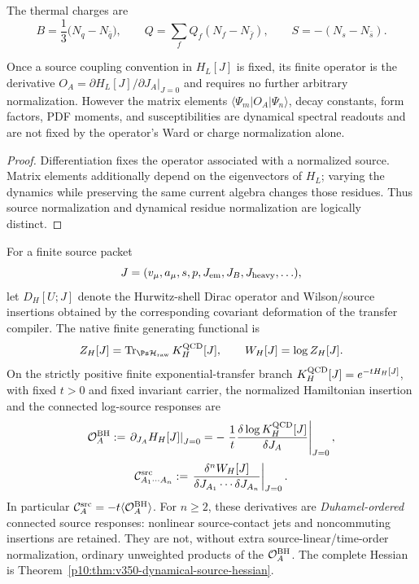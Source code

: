 \documentclass[12pt,a4paper]{article}
\begin{document}
The thermal charges are
\[
B=\frac{1}{3}\bigl(N_q-N_{\bar q}\bigr),
\qquad
Q=\sum_f Q_f(N_f-N_{\bar f}),
\qquad
S=-(N_s-N_{\bar s}).
\]

\begin{theorem}
\label{p10:thm:no-independent-source-normalization}
Once a source coupling convention in \(H_L[J]\) is fixed, its finite operator is the derivative \(O_A=\partial H_L[J]/\partial J_A|_{J=0}\) and requires no further arbitrary normalization.  However the matrix elements
\(\langle\Psi_m|O_A|\Psi_n\rangle\), decay constants, form factors, PDF moments, and susceptibilities are dynamical spectral readouts and are not fixed by the operator's Ward or charge normalization alone.
\end{theorem}
\begin{proof}
Differentiation fixes the operator associated with a normalized source.  Matrix elements additionally depend on the eigenvectors of \(H_L\); varying the dynamics while preserving the same current algebra changes those residues.  Thus source normalization and dynamical residue normalization are logically distinct.
\end{proof}


\begin{definition}
\label{p10:def:native-qcd-generating-functional}
For a finite source packet
\[
J=(v_\mu,a_\mu,s,p,J_{\rm em},J_B,J_{\rm heavy},\ldots),
\]
let \(D_H[U;J]\) denote the Hurwitz-shell Dirac operator and Wilson/source insertions
obtained by the corresponding covariant deformation of the transfer compiler.  The
native finite generating functional is
\begin{equation}
\label{p10:eq:native-qcd-generating-functional}
Z_H[J]
=
\operatorname{Tr}_{\Ps\mathcal H_{\rm raw}}
K_H^{\rm QCD}[J],
\qquad
W_H[J]=\log Z_H[J].
\end{equation}
On the strictly positive finite exponential-transfer branch
\(K_H^{\rm QCD}[J]=e^{-tH_H[J]}\), with fixed \(t>0\) and fixed invariant carrier, the normalized Hamiltonian insertion and the connected log-source responses are
\begin{equation}
\label{p10:eq:native-source-operator-derivative}
\mathcal O_A^{\rm BH}:=\left.\partial_{J_A}H_H[J]\right|_{J=0}
=-\left.\frac1t\frac{\delta\log K_H^{\rm QCD}[J]}{\delta J_A}\right|_{J=0},
\end{equation}
\begin{equation}
\label{p10:eq:native-connected-source-derivatives}
\mathcal C_{A_1\cdots A_n}^{\rm src}
:=\left.\frac{\delta^n W_H[J]}
{\delta J_{A_1}\cdots\delta J_{A_n}}\right|_{J=0}.
\end{equation}
In particular \(\mathcal C_A^{\rm src}=-t\langle\mathcal O_A^{\rm BH}\rangle\). For \(n\ge2\), these derivatives are \emph{Duhamel-ordered} connected source responses: nonlinear source-contact jets and noncommuting insertions are retained. They are not, without extra source-linear/time-order normalization, ordinary unweighted products of the \(\mathcal O_A^{\rm BH}\). The complete Hessian is Theorem~\ref{p10:thm:v350-dynamical-source-hessian}.
\end{definition}
\end{document}
